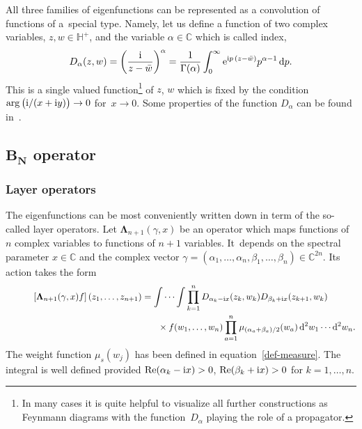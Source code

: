 \documentclass[pdftex]{sigma}%
\numberwithin{equation}{section}
\begin{document}
All three families of eigenfunctions can be represented as a convolution of functions of a~special type. Namely, let us define a
function of two complex variables, $z,w\in \mathbb H^+$, and the variable $\alpha\in \mathbb C$ which is called index,
\begin{gather*}%
 D_{\alpha}(z, w)=\bigg(\frac{\rm i}{z-\bar w}\bigg)^\alpha=\frac{1}{\Gamma(\alpha)}
 \int_0^{\infty} {\rm e}^{{\rm i}p\,(z-\bar w)} p^{\alpha-1} \, {\rm d}p.
\end{gather*}
This is a single valued function\footnote{In many cases it is quite helpful to
visualize all further constructions as Feynmann diagrams with the func\-tion~$D_\alpha$ playing the role of a propagator.} of $z$, $w$ which is
fixed by the condition $\arg\big({\rm i}/(x+{\rm i}y)\big)\to 0$ for~$x\to 0$. Some properties of the function $D_\alpha$ can be found in~\cite{DMspinchainandSL2RGustafson}.

\subsection[BN operator]{$\boldsymbol{B_N}$ operator}%

\subsubsection{Layer operators}

The eigenfunctions can be most conveniently written down in term of the so-called layer ope\-ra\-tors. Let $\boldsymbol\Lambda_{n+1}(\gamma,x)$
be an operator which maps functions of $n$ complex variables to functions of $n+1$ variables. It~depends on the spectral parameter
$x\in\mathbb C$ and the complex vector $\gamma=(\alpha_1,\dots,\alpha_{n}, \beta_1,\dots,\beta_n) \in \mathbb{C}^{2n}$. Its action takes
the form
\begin{gather*}%
\left[\boldsymbol\Lambda_{n+1}(\gamma,x) f\right](z_1,\dots,z_{n+1}) =
\idotsint \prod_{k=1}^{n} D_{\alpha_k-{\rm i}x}(z_k,w_k) D_{\beta_{k}+{\rm i}x}(z_{k+1},w_k)\notag
\\ \hphantom{\left[\boldsymbol\Lambda_{n+1}(\gamma,x) f\right](z_1,\dots,z_{n+1}) =\idotsint}
{}\times f(w_1,\dots,w_{n})\prod_{a=1}^n
\mu_{{(\alpha_a+\beta_{a})}/2}(w_a)
\,{\rm d}^2w_1\cdots {\rm d}^2w_n.
\end{gather*}
The weight function $\mu_{s}(w_j)$ has been defined in equation~\eqref{def-measure}. The integral is well defined provided
$\mathop{\rm Re}(\alpha_k-{\rm i}x)>0$, $\mathop{\rm Re}(\beta_{k}+{\rm i}x)>0$ for $k=1,\dots,n$.
\end{document}

